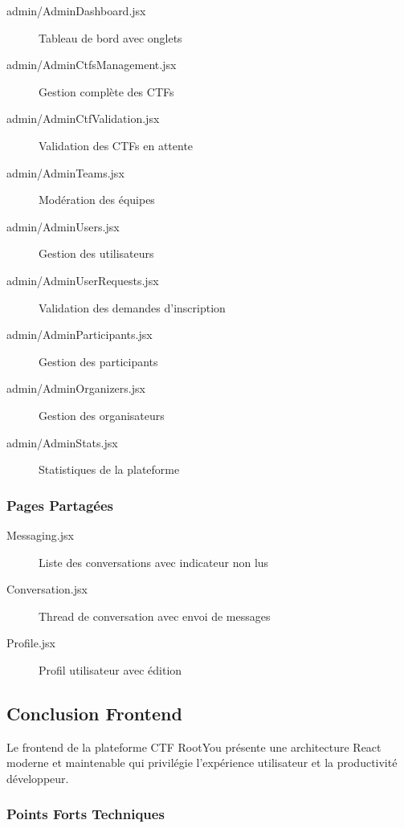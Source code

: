 \begin{description}
    \item[admin/AdminDashboard.jsx] Tableau de bord avec onglets
    \item[admin/AdminCtfsManagement.jsx] Gestion complète des CTFs
    \item[admin/AdminCtfValidation.jsx] Validation des CTFs en attente
    \item[admin/AdminTeams.jsx] Modération des équipes
    \item[admin/AdminUsers.jsx] Gestion des utilisateurs
    \item[admin/AdminUserRequests.jsx] Validation des demandes d'inscription
    \item[admin/AdminParticipants.jsx] Gestion des participants
    \item[admin/AdminOrganizers.jsx] Gestion des organisateurs
    \item[admin/AdminStats.jsx] Statistiques de la plateforme
\end{description}

\subsubsection{Pages Partagées}

\begin{description}
    \item[Messaging.jsx] Liste des conversations avec indicateur non lus
    \item[Conversation.jsx] Thread de conversation avec envoi de messages
    \item[Profile.jsx] Profil utilisateur avec édition
\end{description}

\subsection{Conclusion Frontend}

Le frontend de la plateforme CTF RootYou présente une architecture React moderne et maintenable qui privilégie l'expérience utilisateur et la productivité développeur.

\subsubsection{Points Forts Techniques}

